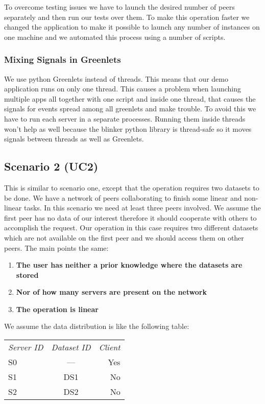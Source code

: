 To overcome testing issues we have to launch the desired number of peers separately and then run our tests 
over them. To make this operation faster we changed the application to make it possible to launch any number
of instances on one machine and we automated this process using a number of scripts. %

\subsubsection{Mixing Signals in Greenlets}
We use python Greenlets instead of threads. This means that our demo application runs on only one thread. 
This causes a problem when launching multiple apps all together with one script and inside one thread, that
causes the signals for events spread among all greenlets and make trouble. To avoid this we have to run
each server in a separate processes. Running them inside threads won't help as well because the blinker python
library is thread-safe so it moves signals between threads as well as Greenlets.

\subsection{Scenario 2 (UC2)}
This is similar to scenario one, except that the operation requires two datasets to be done. We have a network of peers collaborating
to finish some linear and non-linear tasks. In this scenario we need at least three peers involved. We assume the first peer has no
data of our interest therefore it should cooperate with others to accomplish the request. Our operation in this case requires two 
different datasets which are not available on the first peer and we should access them on other peers. The main points the same:

\begin{enumerate}
\item \textbf{The user has neither a prior knowledge where the datasets are stored}
\item \textbf{Nor of how many servers are present on the network}
\item \textbf{The operation is linear}
\end{enumerate}

We assume the data distribution is like the following table:

\begin{tabular}{ l c r }
\em{Server ID} & \em{ Dataset ID} & \em{ Client} \\
S0 & --- & Yes \\
S1 & DS1 & No \\
S2 & DS2 & No \\
\end{tabular}\\

